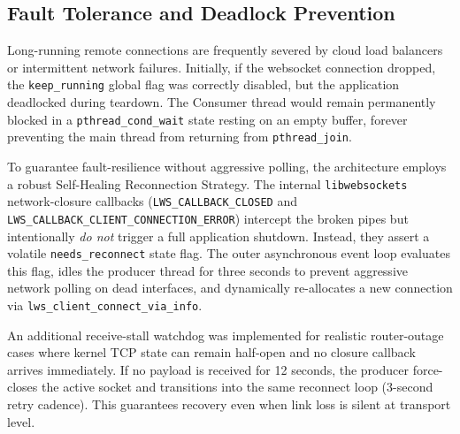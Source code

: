 \documentclass[12pt,a4paper]{article}
\begin{document}
\subsection{Fault Tolerance and Deadlock Prevention}
Long-running remote connections are frequently severed by cloud load balancers or intermittent network failures. Initially, if the websocket connection dropped, the \texttt{keep\_running} global flag was correctly disabled, but the application deadlocked during teardown. The Consumer thread would remain permanently blocked in a \texttt{pthread\_cond\_wait} state resting on an empty buffer, forever preventing the main thread from returning from \texttt{pthread\_join}. 

To guarantee fault-resilience without aggressive polling, the architecture employs a robust Self-Healing Reconnection Strategy. The internal \texttt{libwebsockets} network-closure callbacks (\texttt{LWS\_CALLBACK\_CLOSED} and \texttt{LWS\_CALLBACK\_CLIENT\_CONNECTION\_ERROR}) intercept the broken pipes but intentionally \textit{do not} trigger a full application shutdown. Instead, they assert a volatile \texttt{needs\_reconnect} state flag. The outer asynchronous event loop evaluates this flag, idles the producer thread for three seconds to prevent aggressive network polling on dead interfaces, and dynamically re-allocates a new connection via \texttt{lws\_client\_connect\_via\_info}.

An additional receive-stall watchdog was implemented for realistic router-outage cases where kernel TCP state can remain half-open and no closure callback arrives immediately. If no payload is received for 12 seconds, the producer force-closes the active socket and transitions into the same reconnect loop (3-second retry cadence). This guarantees recovery even when link loss is silent at transport level.
\end{document}
